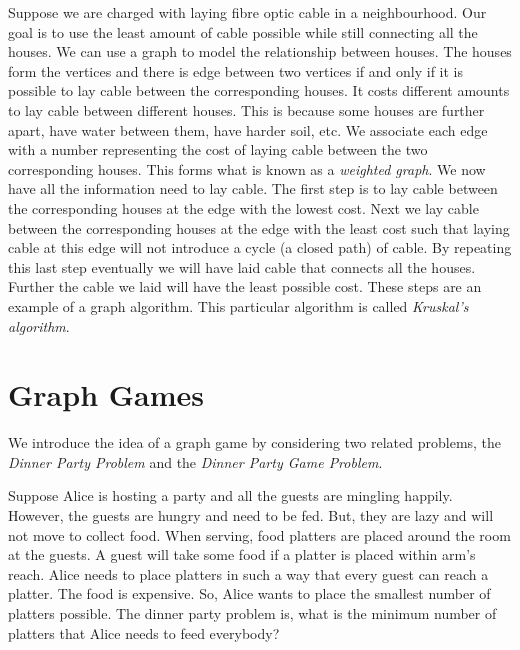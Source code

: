 Suppose we are charged with laying fibre optic cable in a neighbourhood. Our goal is to use the least amount of cable possible while still connecting all the houses. We can use a graph to model the relationship between houses. The houses form the vertices and there is edge between two vertices if and only if it is possible to lay cable between the corresponding houses.
It costs different amounts to lay cable between different houses. This is because some houses are further apart, have water between them, have harder soil, etc. 
We associate each edge with a number representing the cost of laying cable between the two corresponding houses. This forms what is known as a \textit{weighted graph}. We now have all the information need to lay cable. The first step is to lay cable between the corresponding houses at the edge with the lowest cost. Next we lay cable between the corresponding houses at the edge with the least cost such that laying cable at this edge will not introduce a cycle (a closed path) of cable. By repeating this last step eventually we will have laid cable that connects all the houses. Further the cable we laid will have the least possible cost. These steps are an example of a graph algorithm. This particular algorithm is called \textit{Kruskal's algorithm}. 
 
 \section{Graph Games}  
We introduce the idea of a graph game by considering two related problems, the \textit{Dinner Party Problem} and the \textit{Dinner Party Game Problem}.

Suppose Alice is hosting a party and all the guests are mingling happily. However, the guests are hungry and need to be fed. But, they are lazy and will not move to collect food. When serving, food platters are placed around the room at the guests. A guest will take some food if a platter is placed within arm's reach. Alice needs to place platters in such a way that every guest can reach a platter. The food is expensive. So, Alice wants to place the smallest number of platters possible. The dinner party problem is, what is the minimum number of platters that Alice needs to feed everybody? 


